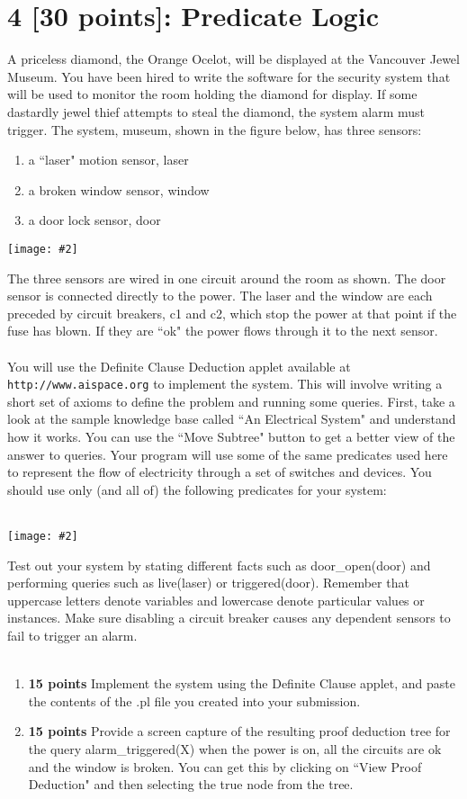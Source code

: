 \documentclass{article}
\newcommand{\centerfig}[2]{\begin{center}\texttt{[image: \#2]}\end{center}}
\begin{document}
\section{4 [30 points]: Predicate Logic}
A priceless diamond, the Orange Ocelot, will be displayed at the Vancouver Jewel Museum. You have been hired to write the software for the security system that will be used to monitor the room holding the diamond for display. If some dastardly jewel thief attempts to steal the diamond, the system alarm must trigger. The system, museum, shown in the figure below, has three sensors:
\begin{enumerate}
    \item a “laser" motion sensor, laser
    \item a broken window sensor, window
    \item a door lock sensor, door
\end{enumerate}
\centerfig{0.7}{../figs/fig3.png}
The three sensors are wired in one circuit around the room as shown. The door sensor is connected directly to the power. The laser and the window are each preceded by circuit breakers, c1 and c2, which stop the power at that point if the fuse has blown. If they are “ok" the power flows through it to the next sensor. \\ \\
You will use the Definite Clause Deduction applet available at \texttt{http://www.aispace.org} to implement the system. This will involve writing a short set of axioms to define the problem and running some queries. First, take a look at the sample knowledge base called “An Electrical System" and understand how it works. You can use the “Move Subtree" button to get a better view of the answer to queries. Your program will use some of the same predicates used here to represent the flow of electricity through a set of switches and devices. You should use only (and all of) the following predicates for your system: \\ \\
\centerfig{0.7}{../figs/fig4.png}
Test out your system by stating different facts such as door\_open(door) and performing queries such as live(laser) or triggered(door). Remember that uppercase letters denote variables and lowercase denote particular values or instances. Make sure disabling a circuit breaker causes any dependent sensors to fail to trigger an alarm. \\ \\
\begin{enumerate}[label=(\alph*)]
    \item \textbf{15 points} Implement the system using the Definite Clause applet, and paste the contents of the .pl file you created into your submission.\\
    \item \textbf{15 points} Provide a screen capture of the resulting proof deduction tree for the query alarm\_triggered(X) when the power is on, all the circuits are ok and the window is broken. You can get this by clicking on “View Proof Deduction" and then selecting the true node from the tree.\\
\end{enumerate}
\end{document}
